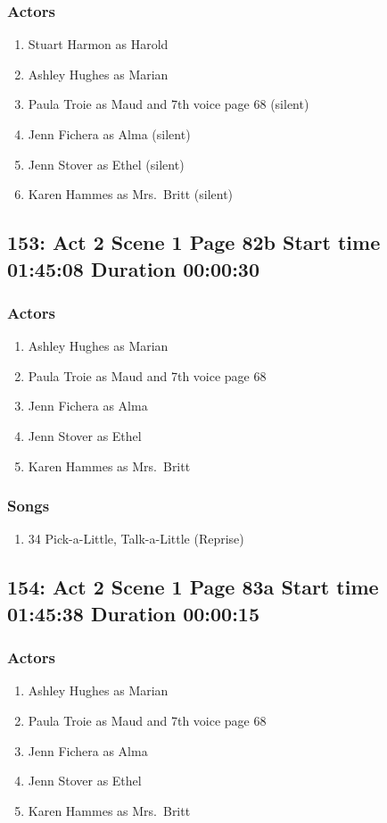 \subsubsection{Actors}
\begin{enumerate}
\item Stuart Harmon as Harold
\item Ashley Hughes as Marian
\item Paula Troie as Maud and 7th voice page 68 (silent)
\item Jenn Fichera as Alma (silent)
\item Jenn Stover as Ethel (silent)
\item Karen Hammes as Mrs.~Britt (silent)
\end{enumerate}


\subsection{153: Act 2 Scene 1 Page 82b Start time 01:45:08 Duration 00:00:30}

\subsubsection{Actors}
\begin{enumerate}
\item Ashley Hughes as Marian
\item Paula Troie as Maud and 7th voice page 68
\item Jenn Fichera as Alma
\item Jenn Stover as Ethel
\item Karen Hammes as Mrs.~Britt
\end{enumerate}

\subsubsection{Songs}
\begin{enumerate}
\item 34 Pick-a-Little, Talk-a-Little (Reprise)
\end{enumerate}
\subsection{154: Act 2 Scene 1 Page 83a Start time 01:45:38 Duration 00:00:15}

\subsubsection{Actors}
\begin{enumerate}
\item Ashley Hughes as Marian
\item Paula Troie as Maud and 7th voice page 68
\item Jenn Fichera as Alma
\item Jenn Stover as Ethel
\item Karen Hammes as Mrs.~Britt
\end{enumerate}

